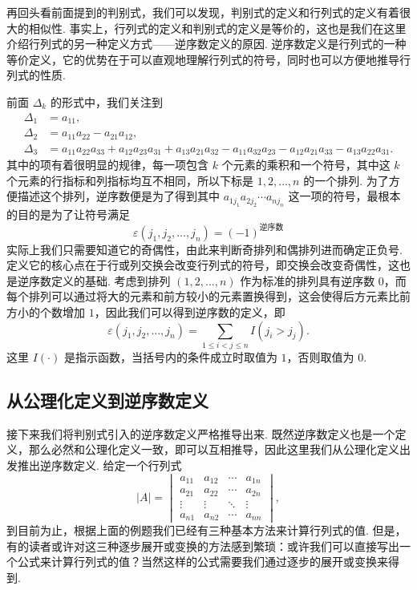 再回头看前面提到的判别式，我们可以发现，判别式的定义和行列式的定义有着很大的相似性. 事实上，行列式的定义和判别式的定义是等价的，这也是我们在这里介绍行列式的另一种定义方式——逆序数定义的原因. 逆序数定义是行列式的一种等价定义，它的优势在于可以直观地理解行列式的符号，同时也可以方便地推导行列式的性质.

前面 $\Delta_k$ 的形式中，我们关注到
\[
\begin{aligned}
    \Delta_1 & = a_{11}, \\
    \Delta_2 & = a_{11}a_{22}-a_{21}a_{12}, \\
    \Delta_3 & = a_{11}a_{22}a_{33}+a_{12}a_{23}a_{31}+a_{13}a_{21}a_{32}-a_{11}a_{32}a_{23}-a_{12}a_{21}a_{33}-a_{13}a_{22}a_{31}.
\end{aligned}
\]
其中的项有着很明显的规律，每一项包含 $k$ 个元素的乘积和一个符号，其中这 $k$ 个元素的行指标和列指标均互不相同，所以下标是 $1,2,\ldots,n$ 的一个排列. 为了方便描述这个排列，逆序数便是为了得到其中 $a_{1j_1}a_{2j_2}\cdots a_{nj_n}$ 这一项的符号，最根本的目的是为了让符号满足
\[
    \varepsilon(j_1,j_2,\ldots,j_n)=(-1)^{\text{逆序数}}
\]
实际上我们只需要知道它的奇偶性，由此来判断奇排列和偶排列进而确定正负号. 定义它的核心点在于行或列交换会改变行列式的符号，即交换会改变奇偶性，这也是逆序数定义的基础. 考虑到排列 $(1,2,\ldots,n)$ 作为标准的排列具有逆序数 $0$，而每个排列可以通过将大的元素和前方较小的元素置换得到，这会使得后方元素比前方小的个数增加 $1$，因此我们可以得到逆序数的定义，即
\[
    \varepsilon(j_1,j_2,\ldots,j_n)=\sum_{1\leq i<j\leq n}I(j_i>j_j).
\]
这里 $I(\cdot)$ 是指示函数，当括号内的条件成立时取值为 $1$，否则取值为 $0$.

\subsection{从公理化定义到逆序数定义}

接下来我们将判别式引入的逆序数定义严格推导出来. 既然逆序数定义也是一个定义，那么必然和公理化定义一致，即可以互相推导，因此这里我们从公理化定义出发推出逆序数定义. 给定一个行列式
\[|A| = \begin{vmatrix}
        a_{11} & a_{12} & \cdots & a_{1n} \\
        a_{21} & a_{22} & \cdots & a_{2n} \\
        \vdots & \vdots & \ddots & \vdots \\
        a_{n1} & a_{n2} & \cdots & a_{nn}
    \end{vmatrix},\]
到目前为止，根据上面的例题我们已经有三种基本方法来计算行列式的值. 但是，有的读者或许对这三种逐步展开或变换的方法感到繁琐：或许我们可以直接写出一个公式来计算行列式的值？当然这样的公式需要我们通过逐步的展开或变换来得到.

